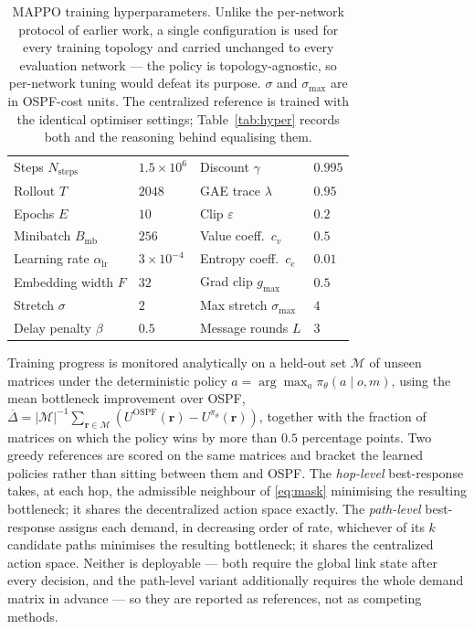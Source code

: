 \begin{table}[h]
\centering
\begin{tabular}{llll}
\hline
Steps $N_{\mathrm{steps}}$ & $1.5\times10^{6}$ & Discount $\gamma$ & $0.995$ \\
Rollout $T$ & $2048$ & GAE trace $\lambda$ & $0.95$ \\
Epochs $E$ & $10$ & Clip $\varepsilon$ & $0.2$ \\
Minibatch $B_{\mathrm{mb}}$ & $256$ & Value coeff.\ $c_v$ & $0.5$ \\
Learning rate $\alpha_{\mathrm{lr}}$ & $3\times10^{-4}$ & Entropy coeff.\ $c_e$ & $0.01$ \\
Embedding width $F$ & $32$ & Grad clip $g_{\max}$ & $0.5$ \\
Stretch $\sigma$ & $2$ & Max stretch $\sigma_{\max}$ & $4$ \\
Delay penalty $\beta$ & $0.5$ & Message rounds $L$ & $3$ \\
\hline
\end{tabular}
\caption{MAPPO training hyperparameters. Unlike the per-network protocol of
earlier work, a single configuration is used for every training topology and
carried unchanged to every evaluation network --- the policy is topology-agnostic,
so per-network tuning would defeat its purpose. $\sigma$ and $\sigma_{\max}$ are
in OSPF-cost units. The centralized reference is trained with the identical
optimiser settings; Table~\ref{tab:hyper} records both and the reasoning behind
equalising them.}
\label{tab:hyperparams}
\end{table}

Training progress is monitored analytically on a held-out set $\mathcal{M}$ of unseen matrices
under the deterministic policy $a = \arg\max_a \pi_\theta(a\mid o,m)$, using the mean
bottleneck improvement over OSPF,
$\overline{\Delta} = |\mathcal{M}|^{-1}\sum_{\mathbf{r}\in\mathcal{M}}
(U^{\mathrm{OSPF}}(\mathbf{r}) - U^{\pi_\theta}(\mathbf{r}))$, together with the
fraction of matrices on which the policy wins by more than $0.5$ percentage points. Two greedy references are scored on the same matrices and bracket the learned
policies rather than sitting between them and OSPF. The \emph{hop-level} best-response takes,
at each hop, the admissible neighbour of \eqref{eq:mask} minimising the resulting bottleneck;
it shares the decentralized action space exactly. The \emph{path-level} best-response assigns
each demand, in decreasing order of rate, whichever of its $k$ candidate paths minimises the
resulting bottleneck; it shares the centralized action space. Neither is deployable --- both
require the global link state after every decision, and the path-level variant additionally
requires the whole demand matrix in advance --- so they are reported as references, not as
competing methods.

